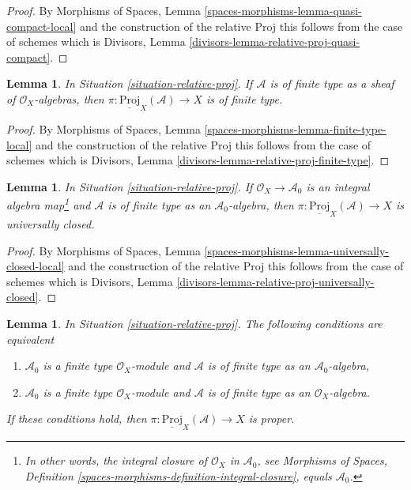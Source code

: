 \documentclass{stacks-project}
\theoremstyle{plain}
\newtheorem{lemma}[subsection]{Lemma}
\theoremstyle{definition}
\theoremstyle{remark}
\numberwithin{equation}{subsection}
\begin{document}
\begin{proof}
By Morphisms of Spaces, Lemma \ref{spaces-morphisms-lemma-quasi-compact-local}
and the construction of the relative Proj this follows from the
case of schemes which is
Divisors, Lemma \ref{divisors-lemma-relative-proj-quasi-compact}.
\end{proof}

\begin{lemma}
\label{lemma-relative-proj-finite-type}
In Situation \ref{situation-relative-proj}.
If $\mathcal{A}$ is of finite type as a sheaf of
$\mathcal{O}_X$-algebras, then
$\pi : \underline{\text{Proj}}_X(\mathcal{A}) \to X$ is of finite type.
\end{lemma}

\begin{proof}
By Morphisms of Spaces, Lemma \ref{spaces-morphisms-lemma-finite-type-local}
and the construction of the relative Proj this follows from the
case of schemes which is
Divisors, Lemma \ref{divisors-lemma-relative-proj-finite-type}.
\end{proof}

\begin{lemma}
\label{lemma-relative-proj-universally-closed}
In Situation \ref{situation-relative-proj}. If
$\mathcal{O}_X \to \mathcal{A}_0$
is an integral algebra map\footnote{In other words, the integral
closure of $\mathcal{O}_X$ in $\mathcal{A}_0$, see
Morphisms of Spaces, Definition
\ref{spaces-morphisms-definition-integral-closure}, equals
$\mathcal{A}_0$.} and $\mathcal{A}$ is of finite type as an
$\mathcal{A}_0$-algebra, then
$\pi : \underline{\text{Proj}}_X(\mathcal{A}) \to X$ is universally closed.
\end{lemma}

\begin{proof}
By Morphisms of Spaces, Lemma
\ref{spaces-morphisms-lemma-universally-closed-local}
and the construction of the relative Proj this follows from the
case of schemes which is
Divisors, Lemma \ref{divisors-lemma-relative-proj-universally-closed}.
\end{proof}

\begin{lemma}
\label{lemma-relative-proj-proper}
In Situation \ref{situation-relative-proj}.
The following conditions are equivalent
\begin{enumerate}
\item $\mathcal{A}_0$ is a finite type $\mathcal{O}_X$-module
and $\mathcal{A}$ is of finite type as an $\mathcal{A}_0$-algebra,
\item $\mathcal{A}_0$ is a finite type $\mathcal{O}_X$-module 
and $\mathcal{A}$ is of finite type as an $\mathcal{O}_X$-algebra.
\end{enumerate}
If these conditions hold, then
$\pi : \underline{\text{Proj}}_X(\mathcal{A}) \to X$
is proper.
\end{lemma}
\end{document}
